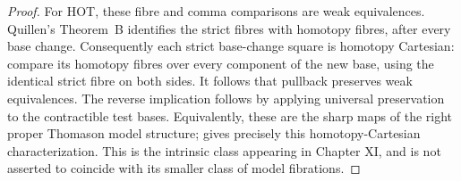 \begin{proof}
For HOT, these fibre and comma comparisons are weak equivalences. Quillen's Theorem~B identifies the strict fibres with homotopy fibres, after every base change. Consequently each strict base-change square is homotopy Cartesian: compare its homotopy fibres over every component of the new base, using the identical strict fibre on both sides. It follows that pullback preserves weak equivalences. The reverse implication follows by applying universal preservation to the contractible test bases. Equivalently, these are the sharp maps of the right proper Thomason model structure; \citet[Proposition 2.7]{Rezk1998Sharp} gives precisely this homotopy-Cartesian characterization. This is the intrinsic class appearing in Chapter XI, and is not asserted to coincide with its smaller class of model fibrations.
\end{proof}

